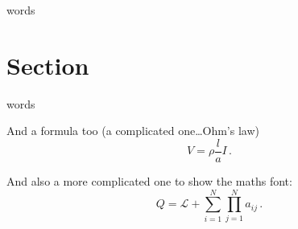 \documentclass[../main.tex]{subfiles}
\begin{document}
words
\section{Section}
words

And a formula too (a complicated one\dots Ohm's law)
\begin{equation}
V=\rho\frac{l}{a}I\,.
\end{equation}

And also a more complicated one to show the maths font:
\begin{equation}
Q=\mathcal{L}+\sum_{i=1}^{N}\prod_{j=1}^{N}a_{ij}\,.
\end{equation}
\end{document}
